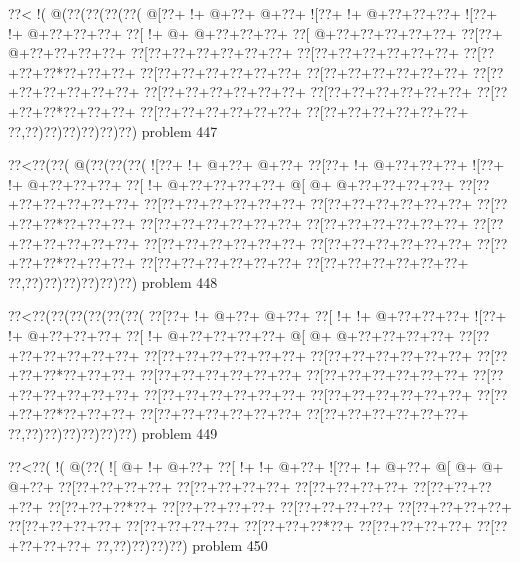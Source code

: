\vbox{\vbox{\goo
\0??<\- !(\- @(\0??(\0??(\0??(\0??(
\- @[\0??+\- !+\- @+\0??+\- @+\0??+
\- ![\0??+\- !+\- @+\0??+\0??+\0??+
\- ![\0??+\- !+\- @+\0??+\0??+\0??+
\0??[\- !+\- @+\- @+\0??+\0??+\0??+
\0??[\- @+\0??+\0??+\0??+\0??+\0??+
\0??[\0??+\- @+\0??+\0??+\0??+\0??+
\0??[\0??+\0??+\0??+\0??+\0??+\0??+
\0??[\0??+\0??+\0??+\0??+\0??+\0??+
\0??[\0??+\0??+\0??*\0??+\0??+\0??+
\0??[\0??+\0??+\0??+\0??+\0??+\0??+
\0??[\0??+\0??+\0??+\0??+\0??+\0??+
\0??[\0??+\0??+\0??+\0??+\0??+\0??+
\0??[\0??+\0??+\0??+\0??+\0??+\0??+
\0??[\0??+\0??+\0??+\0??+\0??+\0??+
\0??[\0??+\0??+\0??*\0??+\0??+\0??+
\0??[\0??+\0??+\0??+\0??+\0??+\0??+
\0??[\0??+\0??+\0??+\0??+\0??+\0??+
\0??,\0??)\0??)\0??)\0??)\0??)\0??)
}
\hfil problem 447\hfil\break
}

\vbox{\vbox{\goo
\0??<\0??(\0??(\- @(\0??(\0??(\0??(
\- ![\0??+\- !+\- @+\0??+\- @+\0??+
\0??[\0??+\- !+\- @+\0??+\0??+\0??+
\- ![\0??+\- !+\- @+\0??+\0??+\0??+
\0??[\- !+\- @+\0??+\0??+\0??+\0??+
\- @[\- @+\- @+\0??+\0??+\0??+\0??+
\0??[\0??+\0??+\0??+\0??+\0??+\0??+
\0??[\0??+\0??+\0??+\0??+\0??+\0??+
\0??[\0??+\0??+\0??+\0??+\0??+\0??+
\0??[\0??+\0??+\0??*\0??+\0??+\0??+
\0??[\0??+\0??+\0??+\0??+\0??+\0??+
\0??[\0??+\0??+\0??+\0??+\0??+\0??+
\0??[\0??+\0??+\0??+\0??+\0??+\0??+
\0??[\0??+\0??+\0??+\0??+\0??+\0??+
\0??[\0??+\0??+\0??+\0??+\0??+\0??+
\0??[\0??+\0??+\0??*\0??+\0??+\0??+
\0??[\0??+\0??+\0??+\0??+\0??+\0??+
\0??[\0??+\0??+\0??+\0??+\0??+\0??+
\0??,\0??)\0??)\0??)\0??)\0??)\0??)
}
\hfil problem 448\hfil\break
}

\vbox{\vbox{\goo
\0??<\0??(\0??(\0??(\0??(\0??(\0??(
\0??[\0??+\- !+\- @+\0??+\- @+\0??+
\0??[\- !+\- !+\- @+\0??+\0??+\0??+
\- ![\0??+\- !+\- @+\0??+\0??+\0??+
\0??[\- !+\- @+\0??+\0??+\0??+\0??+
\- @[\- @+\- @+\0??+\0??+\0??+\0??+
\0??[\0??+\0??+\0??+\0??+\0??+\0??+
\0??[\0??+\0??+\0??+\0??+\0??+\0??+
\0??[\0??+\0??+\0??+\0??+\0??+\0??+
\0??[\0??+\0??+\0??*\0??+\0??+\0??+
\0??[\0??+\0??+\0??+\0??+\0??+\0??+
\0??[\0??+\0??+\0??+\0??+\0??+\0??+
\0??[\0??+\0??+\0??+\0??+\0??+\0??+
\0??[\0??+\0??+\0??+\0??+\0??+\0??+
\0??[\0??+\0??+\0??+\0??+\0??+\0??+
\0??[\0??+\0??+\0??*\0??+\0??+\0??+
\0??[\0??+\0??+\0??+\0??+\0??+\0??+
\0??[\0??+\0??+\0??+\0??+\0??+\0??+
\0??,\0??)\0??)\0??)\0??)\0??)\0??)
}
\hfil problem 449\hfil\break
}

\vbox{\vbox{\goo
\0??<\0??(\- !(\- @(\0??(
\- ![\- @+\- !+\- @+\0??+
\0??[\- !+\- !+\- @+\0??+
\- ![\0??+\- !+\- @+\0??+
\- @[\- @+\- @+\- @+\0??+
\0??[\0??+\0??+\0??+\0??+
\0??[\0??+\0??+\0??+\0??+
\0??[\0??+\0??+\0??+\0??+
\0??[\0??+\0??+\0??+\0??+
\0??[\0??+\0??+\0??*\0??+
\0??[\0??+\0??+\0??+\0??+
\0??[\0??+\0??+\0??+\0??+
\0??[\0??+\0??+\0??+\0??+
\0??[\0??+\0??+\0??+\0??+
\0??[\0??+\0??+\0??+\0??+
\0??[\0??+\0??+\0??*\0??+
\0??[\0??+\0??+\0??+\0??+
\0??[\0??+\0??+\0??+\0??+
\0??,\0??)\0??)\0??)\0??)
}
\hfil problem 450\hfil\break
}

